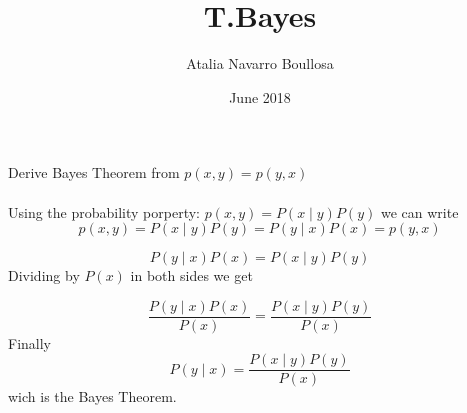 \documentclass{article}
\title{T.Bayes}
\author{Atalia Navarro Boullosa }
\date{June 2018}
\begin{document}
\maketitle
Derive Bayes Theorem from $p(x,y) = p(y,x)$ \\
\ \\
Using the probability porperty: $p(x,y) = P(x\mid y)P(y)$ we can write\\
\begin{equation}
   p(x,y) = P(x\mid y)P(y) = P(y\mid x)P(x) = p(y,x)
\end{equation}

\begin{equation}
    P(y\mid x)P(x) = P(x\mid y)P(y)
\end{equation}
Dividing by $P(x)$ in both sides we get

\begin{equation}
    \frac{P(y\mid x)P(x)}{P(x)} = \frac{P(x\mid y)P(y)}{P(x)}
\end{equation}
Finally
\begin{equation}
    P(y\mid x) = \frac{P(x\mid y)P(y)}{P(x)}
\end{equation}
wich is the Bayes Theorem.
\end{document}
